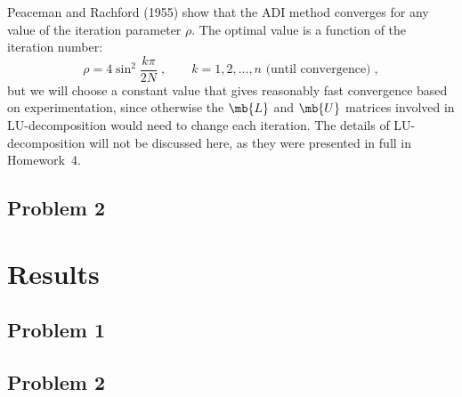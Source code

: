 \documentclass[11pt]{article}
\begin{document}
Peaceman and Rachford (1955) show that the ADI method converges for any value of the iteration parameter $\rho$. The optimal value is a function of the iteration number:
\begin{equation}
\rho = 4 \sin^2 \frac{k \pi}{2 N}
\;, \qquad
k = 1, 2, ..., n \text{ (until convergence)}
\;,
\end{equation}
but we will choose a constant value that gives reasonably fast convergence based on experimentation, since otherwise the $\mb{L}$ and $\mb{U}$ matrices involved in LU-decomposition would need to change each iteration. The details of LU-decomposition will not be discussed here, as they were presented in full in Homework~4.

\subsection{Problem 2}

\section{Results} %

\subsection{Problem 1}

\subsection{Problem 2}

\end{document}
